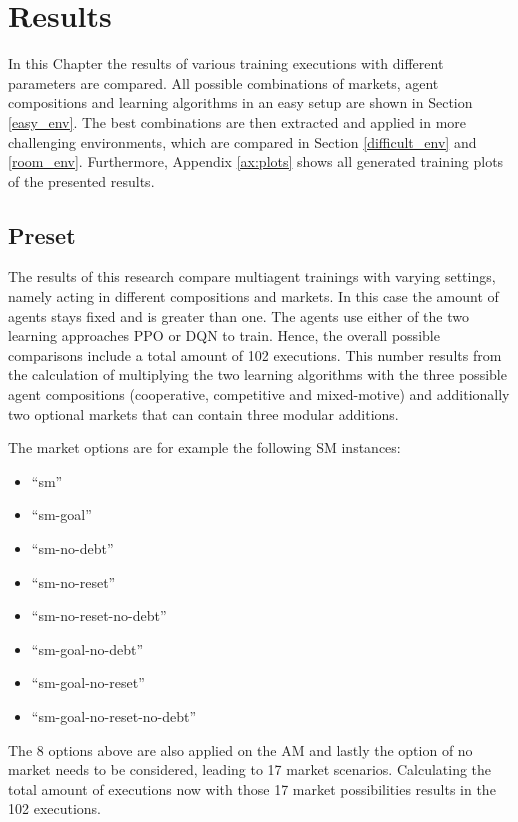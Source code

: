 \chapter{Results}\label{sec:Results}
In this Chapter the results of various training executions with different parameters are compared. All possible combinations of markets, agent compositions and learning algorithms in an easy setup are shown in Section \ref{easy_env}. The best combinations are then extracted and applied in more challenging environments, which are compared in Section \ref{difficult_env} and \ref{room_env}. Furthermore, Appendix \ref{ax:plots} shows all generated training plots of the presented results.

\section{Preset} \label{setup}

The results of this research compare multiagent trainings with varying settings, namely acting in different compositions and markets. In this case the amount of agents stays fixed and is greater than one. The agents use either of the two learning approaches PPO or DQN to train. Hence, the overall possible comparisons include a total amount of 102 executions. This number results from the calculation of multiplying the two learning algorithms with the three possible agent compositions (cooperative, competitive and mixed-motive) and additionally two optional markets that can contain three modular additions. 

The market options are for example the following SM instances: 
\begin{itemize}
    \item ``sm''
    \item ``sm-goal''
    \item ``sm-no-debt''
    \item ``sm-no-reset''
    \item ``sm-no-reset-no-debt''
    \item ``sm-goal-no-debt''
    \item ``sm-goal-no-reset''
    \item ``sm-goal-no-reset-no-debt''
\end{itemize}
The 8 options above are also applied on the AM and lastly the option of no market needs to be considered, leading to 17 market scenarios. Calculating the total amount of executions now with those 17 market possibilities results in the 102 executions.

